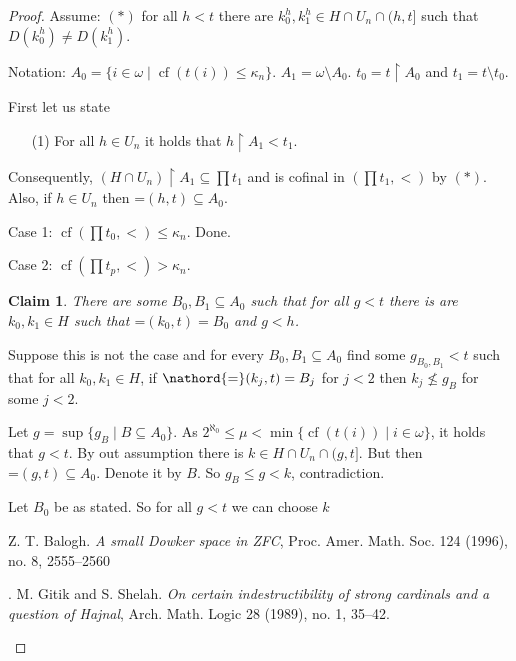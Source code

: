 \documentclass{amsart}
\newtheorem{claim}{Claim}[theorem]
\theoremstyle{remark}
\DeclareMathOperator{\cf}{cf}
\renewcommand\mid{\mathrel{|}\allowbreak}
\begin{document}
\begin{proof}
Assume: $(*)$ for all $h<t$ there are $k^h_0,k^h_1\in H\cap U_n \cap (h,t]$ such that $D(k^h_0)\not=D(k^h_1)$.

Notation: $A_0=\{i\in \omega\mid \cf(t(i))\le \kappa_n\}$. $A_1=\omega\setminus A_0$.  
$t_0=t\restriction A_0$ and $t_1=t\setminus t_0$. 

First let us state
\begin{enumerate}
\item[(1)]For all $h\in U_n$ it holds that $h\restriction A_1 < t_1$.
\end{enumerate}

Consequently, $(H\cap U_n)\restriction A_1\subseteq \prod t_1$ and 
is cofinal in $(\prod t_1,<)$ by $(*)$. Also, if $h\in U_n$ then $\mathord{=}(h,t)\subseteq A_0$.



Case 1: $\cf(\prod t_0,<)\le \kappa_n$. Done. 

Case 2: $\cf(\prod t_p,<)> \kappa_n$. 


\begin{claim}
There are some $B_0,B_1\subseteq A_0$ such that for all $g<t$ there is are $k_0,k_1\in H$ such 
that $\mathord{=}(k_0,t)=B_0$ and $g < h$. 
\end{claim}

Suppose this is not the case and for every $B_0,B_1\subseteq A_0$ find some $g_{B_0,B_1}<t$ such that 
for all $k_0,k_1\in H$, if $\nathord{=}(k_j,t)=B_j$ for $j<2$ then $k_j\not\le g_B$ for some $j<2$.

Let $g=\sup\{g_B\mid B\subseteq A_0\}$. As $2^{\aleph_0}\le \mu <\min\{\cf(t(i))\mid i\in \omega\}$,
it holds that $g<t$. By out assumption there is $k\in H\cap U_n\cap (g,t]$. But then 
$\mathord{=}(g,t)\subseteq A_0$. Denote it by $B$. So $g_B\le g<k$, contradiction. 

Let $B_0$ be as stated. So for all $g<t$ we can choose $k$




 \begin{thebibliography}{}
 


 Z. T. Balogh. {\sl A small Dowker space in ZFC},
Proc. Amer. Math. Soc. 124 (1996), no. 8, 2555–2560

. 
M. Gitik and S. Shelah.
{\sl On certain indestructibility of strong cardinals and a question of Hajnal},
Arch. Math. Logic 28 (1989), no. 1, 35–42.




\end{thebibliography}
\end{proof}
\end{document}
